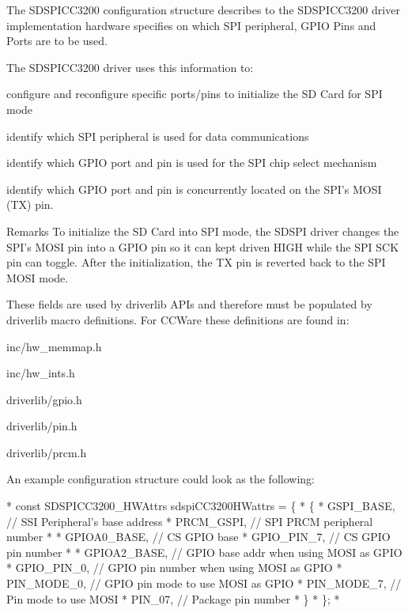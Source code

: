 The S\-D\-S\-P\-I\-C\-C3200 configuration structure describes to the S\-D\-S\-P\-I\-C\-C3200 driver implementation hardware specifies on which S\-P\-I peripheral, G\-P\-I\-O Pins and Ports are to be used.

The S\-D\-S\-P\-I\-C\-C3200 driver uses this information to\-:
\begin{DoxyItemize}
\item configure and reconfigure specific ports/pins to initialize the S\-D Card for S\-P\-I mode
\item identify which S\-P\-I peripheral is used for data communications
\item identify which G\-P\-I\-O port and pin is used for the S\-P\-I chip select mechanism
\item identify which G\-P\-I\-O port and pin is concurrently located on the S\-P\-I's M\-O\-S\-I (T\-X) pin.
\end{DoxyItemize}

\begin{DoxyRemark}{Remarks}
To initialize the S\-D Card into S\-P\-I mode, the S\-D\-S\-P\-I driver changes the S\-P\-I's M\-O\-S\-I pin into a G\-P\-I\-O pin so it can kept driven H\-I\-G\-H while the S\-P\-I S\-C\-K pin can toggle. After the initialization, the T\-X pin is reverted back to the S\-P\-I M\-O\-S\-I mode.
\end{DoxyRemark}
These fields are used by driverlib A\-P\-Is and therefore must be populated by driverlib macro definitions. For C\-C\-Ware these definitions are found in\-:
\begin{DoxyItemize}
\item inc/hw\-\_\-memmap.\-h
\item inc/hw\-\_\-ints.\-h
\item driverlib/gpio.\-h
\item driverlib/pin.\-h
\item driverlib/prcm.\-h
\end{DoxyItemize}

An example configuration structure could look as the following\-: 
\begin{DoxyCode}
*  \textcolor{keyword}{const} SDSPICC3200_HWAttrs sdspiCC3200HWattrs = \{
*      \{
*            GSPI\_BASE,      \textcolor{comment}{// SSI Peripheral's base address}
*            PRCM\_GSPI,      \textcolor{comment}{// SPI PRCM peripheral number}
*
*            GPIOA0\_BASE,    \textcolor{comment}{// CS GPIO base}
*            GPIO\_PIN\_7,     \textcolor{comment}{// CS GPIO pin number}
*
*            GPIOA2\_BASE,    \textcolor{comment}{// GPIO base addr when using MOSI as GPIO}
*            GPIO\_PIN\_0,     \textcolor{comment}{// GPIO pin number when using MOSI as GPIO}
*            PIN\_MODE\_0,     \textcolor{comment}{// GPIO pin mode to use MOSI as GPIO}
*            PIN\_MODE\_7,     \textcolor{comment}{// Pin mode to use MOSI}
*            PIN\_07,         \textcolor{comment}{// Package pin number}
*      \}
*  \};
*  
\end{DoxyCode}
 

